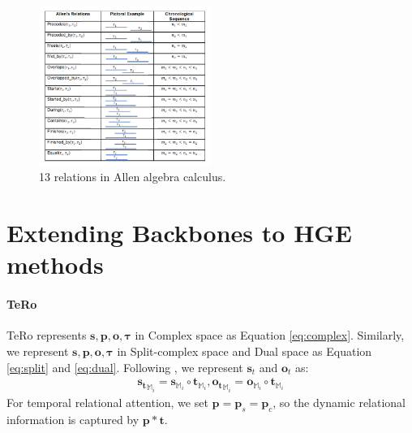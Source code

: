 \documentclass[letterpaper]{article} %
\begin{document}
\begin{figure}[!h]
  \centering
  \includegraphics[width=0.5\textwidth]{allen.pdf}
  \caption{13 relations in Allen algebra calculus.}
  \label{fig:allen relations}
\end{figure}

\section{Extending Backbones to HGE methods}
\paragraph{TeRo}
TeRo \cite{xu2020tero} represents $\boldsymbol{s,p,o, \tau}$ in Complex space as Equation \ref{eq:complex}. Similarly, we represent $\boldsymbol{s,p,o, \tau}$ in Split-complex space and Dual space as Equation \ref{eq:split} and \ref{eq:dual}. Following \cite{xu2020tero}, we represent $\boldsymbol{s}_{t}$ and $\boldsymbol{o}_{t}$ as:
\begin{equation}
\begin{aligned}
        \boldsymbol{s_{t}}_{\mathbb{M}_{i}}= \boldsymbol{s}_{\mathbb{M}_{i}} \circ \boldsymbol{t}_{\mathbb{M}_{i}}, 
                \boldsymbol{o_{t}}_{\mathbb{M}_{i}}= \boldsymbol{o}_{\mathbb{M}_{i}} \circ \boldsymbol{t}_{\mathbb{M}_{i}}
\end{aligned}
\end{equation}
For temporal relational attention, we set $\boldsymbol{p} = \boldsymbol{p}_{s} = \boldsymbol{p}_{c}$, so the dynamic relational information is captured by $\boldsymbol{p}*\boldsymbol{t}$.
\end{document}
